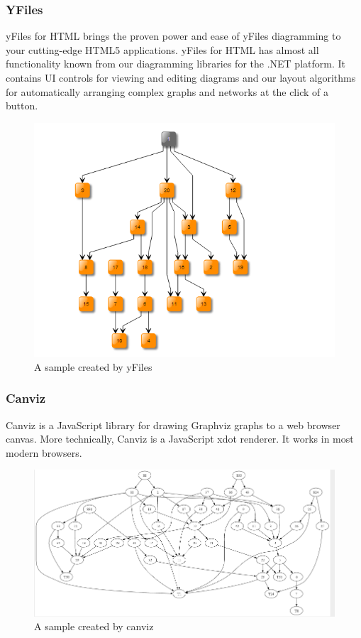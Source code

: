 \documentclass[14pt,a4paper]{extreport}
\begin{document}
 			\subsubsection{YFiles}
 			yFiles for HTML brings the proven power and ease of yFiles diagramming to your cutting-edge HTML5 applications. yFiles for HTML has almost all functionality known from our diagramming libraries for the .NET platform. It contains UI controls for viewing and editing diagrams and our layout algorithms for automatically arranging complex graphs and networks at the click of a button.
				\begin{figure}[ht]
 					\begin{center}
 						\includegraphics[scale=0.5]{yfiles.png}
 						\caption{A sample created by yFiles}
 					\end{center}
 				\end{figure} 			
 			\subsubsection{Canviz}
 			Canviz is a JavaScript library for drawing Graphviz graphs to a web browser canvas. More technically, Canviz is a JavaScript xdot renderer. It works in most modern browsers.
				\begin{figure}[ht]
 					\begin{center}
 						\includegraphics[scale=0.5]{canviz.png}
 						\caption{A sample created by canviz}
 					\end{center}
 				\end{figure} 			
 			
\end{document}
